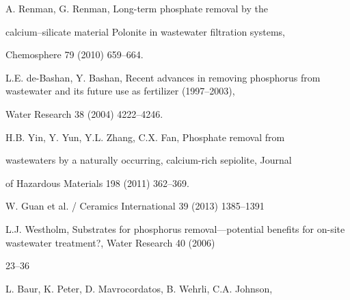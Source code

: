 \documentclass[a4paper,portrait,12pt]{article}
\begin{document}
\begin{flushleft}
[12] A. Renman, G. Renman, Long-term phosphate removal by the
\end{flushleft}


\begin{flushleft}
calcium--silicate material Polonite in wastewater ﬁltration systems,
\end{flushleft}


\begin{flushleft}
Chemosphere 79 (2010) 659--664.
\end{flushleft}


\begin{flushleft}
[13] L.E. de-Bashan, Y. Bashan, Recent advances in removing phosphorus from wastewater and its future use as fertilizer (1997--2003),
\end{flushleft}


\begin{flushleft}
Water Research 38 (2004) 4222--4246.
\end{flushleft}


\begin{flushleft}
[14] H.B. Yin, Y. Yun, Y.L. Zhang, C.X. Fan, Phosphate removal from
\end{flushleft}


\begin{flushleft}
wastewaters by a naturally occurring, calcium-rich sepiolite, Journal
\end{flushleft}


\begin{flushleft}
of Hazardous Materials 198 (2011) 362--369.
\end{flushleft}





\begin{flushleft}
\newpage
W. Guan et al. / Ceramics International 39 (2013) 1385--1391
\end{flushleft}


\begin{flushleft}
[15] L.J. Westholm, Substrates for phosphorus removal---potential beneﬁts for on-site wastewater treatment?, Water Research 40 (2006)
\end{flushleft}


23--36


\begin{flushleft}
[16] L. Baur, K. Peter, D. Mavrocordatos, B. Wehrli, C.A. Johnson,
\end{flushleft}
\end{document}
